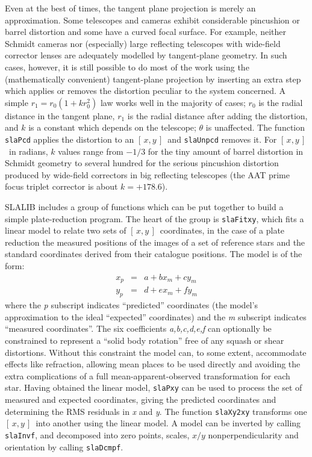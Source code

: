 \documentclass[11pt,fleqn,twoside]{article}
\renewcommand{\_}{{\tt\char'137}}     %
\newcommand{\xy}        {$[\,x,y\,]$}
\begin{document}
Even at the best of times, the tangent plane projection is merely an
approximation.  Some telescopes and cameras exhibit considerable pincushion
or barrel distortion and some have a curved focal surface.
For example, neither Schmidt cameras nor (especially)
large reflecting telescopes with wide-field corrector lenses
are adequately modelled by tangent-plane geometry.  In such
cases, however, it is still possible to do most of the work
using the (mathematically convenient) tangent-plane
projection by inserting an extra step which applies or
removes the distortion peculiar to the system concerned.
A simple $r_1=r_0(1+kr_0^2)$ law works well in the
majority of cases; $r_0$ is the radial distance in the
tangent plane, $r_1$ is the radial distance after adding
the distortion, and $k$ is a constant which depends on the
telescope; $\theta$ is unaffected.  The function
{\tt slaPcd}
applies the distortion to an \xy\ and
{\tt slaUnpcd}
removes it.  For \xy\ in radians, $k$ values range from $-1/3$ for the
tiny amount of barrel distortion in Schmidt geometry to several
hundred for the serious pincushion distortion
produced by wide-field correctors in big reflecting telescopes
(the AAT prime focus triplet corrector is about $k=+178.6$).
 
SLALIB includes a group of functions which can be put together
to build a simple plate-reduction program.  The heart of the group is
{\tt slaFitxy},
which fits a linear model to relate two sets of \xy\ coordinates,
in the case of a plate reduction the measured positions of the
images of a set of
reference stars and the standard
coordinates derived from their catalogue positions.  The
model is of the form:
\begin{eqnarray}
x_{p} & = & a + bx_{m} + cy_{m} \nonumber \\
y_{p} & = & d + ex_{m} + fy_{m} \nonumber
\end{eqnarray}
where the {\it p}\/ subscript indicates ``predicted'' coordinates
(the model's approximation to the ideal ``expected'' coordinates) and the
{\it m}\/ subscript indicates ``measured coordinates''.  The
six coefficients {\it a,b,c,d,e,f}\/ can optionally be
constrained to represent a ``solid body rotation'' free of
any squash or shear distortions.  Without this constraint
the model can, to some extent, accommodate effects like refraction,
allowing mean places to be used directly and
avoiding the extra complications of a
full mean-apparent-observed transformation for each star.
Having obtained the linear model,
{\tt slaPxy}
can be used to process the set of measured and expected
coordinates, giving the predicted coordinates and determining
the RMS residuals in {\it x}\/ and {\it y}.
The function
{\tt slaXy2xy}
transforms one \xy\ into another using the linear model.  A model
can be inverted by calling
{\tt slaInvf},
and decomposed into zero points, scales, $x/y$ nonperpendicularity
and orientation by calling
{\tt slaDcmpf}.
\end{document}
